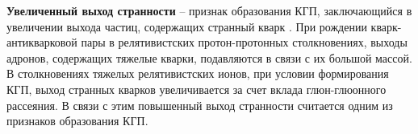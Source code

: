 \textbf{Увеличенный выход странности}
-- признак образования КГП, заключающийся в увеличении выхода частиц, содержащих странный кварк \cite{StrangEnh, Strangeness_QGP}. При рождении кварк-антикварковой пары в релятивистских протон-протонных столкновениях, выходы адронов, содержащих тяжелые кварки, подавляются в связи с их большой массой. В столкновениях тяжелых релятивистских ионов, при условии формирования КГП, выход странных кварков увеличивается за счет вклада глюн-глюонного рассеяния. В связи с этим повышенный выход странности считается одним из признаков образования КГП. 

\begin{comment}
	\begin{figure}[] 
		\center
		\includegraphics [width = 0.5\linewidth] {Intro/Strangeness_enhancement.png}
		\caption{Механизм образования странных кварков, основанный на модели термальной КХД.}
		\label{img:StrangenessEnhancement}  
	\end{figure}
\end{comment}
\begin{comment}
	\textbf{Динамика столкновения и уравнение состояния}
	Ожидается, что изучение коллективного движения образовавшихся адронов в конечном состоянии даст информацию о динамике столкновений тяжелых ионов. С гидродинамической точки зрения на столкновения,
	коллективное движение определяется градиентом давления сжатой ядерной материи на ранней стадии столкновения. В случае фазового перехода от порядковой ядерной к кварк-глюонной плазме ожидается соответствующее смягчение уравнения состояния за счет увеличения числа степеней свободы [4]. Таким образом, наблюдение за коллективным движением крайне важно для подтверждения гидродинамического описания динамики. Если фазовый переход первого рода, то уравнение состояния будет наиболее «мягким» при критической температуре Tc. Ожидается, что такое смягчение повлияет на динамическую эволюцию системы, поскольку внутреннее давление падает при Tc. Таким образом, наблюдение за функцией возбуждения поперечного коллективного потока может служить зондом для формирования КГП; падение функции возбуждения коллективного потока свидетельствует о пороговой энергии образования КГП.
\end{comment}

